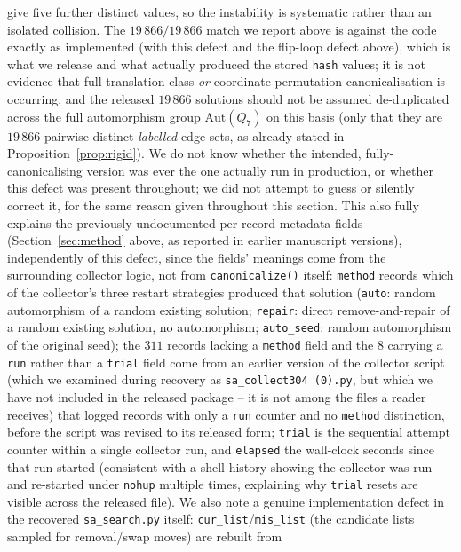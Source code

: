 \documentclass[12pt]{article}
\begin{document}
give five further distinct values, so the instability is systematic
rather than an isolated collision. The $19\,866/19\,866$ match we
report above is against the code exactly as implemented (with this
defect and the flip-loop defect above), which is what we release and
what actually produced the
stored \texttt{hash} values; it is not evidence that full
translation-class \emph{or} coordinate-permutation canonicalisation is
occurring, and the released
$19\,866$ solutions should not be assumed de-duplicated across the
full automorphism group $\mathrm{Aut}(Q_7)$ on this basis (only that
they are $19\,866$ pairwise distinct \emph{labelled} edge sets, as
already stated in Proposition~\ref{prop:rigid}). We do not know
whether the intended, fully-canonicalising version was ever the one
actually run in production, or whether this defect was present
throughout; we did not attempt to guess or silently correct it, for
the same reason given throughout this section. This also fully explains the
previously undocumented per-record metadata fields
(Section~\ref{sec:method} above, as reported in earlier manuscript
versions), independently of this defect, since the fields' meanings
come from the surrounding collector logic, not from
\texttt{canonicalize()} itself: \texttt{method} records which of the collector's three
restart strategies produced that solution (\texttt{auto}: random
automorphism of a random existing solution; \texttt{repair}: direct
remove-and-repair of a random existing solution, no automorphism;
\texttt{auto\_seed}: random automorphism of the original seed); the
$311$ records lacking a \texttt{method} field and the $8$ carrying a
\texttt{run} rather than a \texttt{trial} field come from an earlier
version of the collector script (which we examined during recovery as
\texttt{sa\_collect304~(0).py}, but which we have not included in the
released package -- it is not among the files a reader receives) that
logged
records with only a \texttt{run} counter and no \texttt{method}
distinction, before the script was revised to its released form;
\texttt{trial} is the sequential attempt counter within a single
collector run, and \texttt{elapsed} the wall-clock seconds since that
run started (consistent with a shell history showing the collector
was run and re-started under \texttt{nohup} multiple times, explaining
why \texttt{trial} resets are visible across the released file). We
also note a genuine implementation defect in the recovered
\texttt{sa\_search.py} itself: \texttt{cur\_list}/\texttt{mis\_list}
(the candidate lists sampled for removal/swap moves) are rebuilt from
\end{document}
